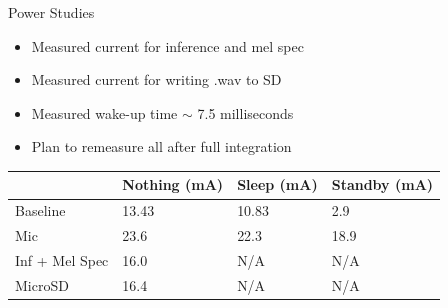 \begin{frame}{Power Studies}
    \begin{itemize}
        \item Measured current for inference and mel spec 
        \item Measured current for writing .wav to SD
        \item Measured wake-up time $\sim$ 7.5 milliseconds
        \item Plan to remeasure all after full integration
    \end{itemize}
    \begin{center}
        \begin{table}[]
        \begin{tabular}{llll}
        \hline
                & Nothing (mA) & Sleep (mA) & Standby (mA) \\ \hline
        Baseline       & 13.43        & 10.83      & 2.9          \\
        Mic            & 23.6         & 22.3       & 18.9         \\
        Inf + Mel Spec & 16.0         & N/A        & N/A          \\
        MicroSD        & 16.4         & N/A        & N/A          \\ \hline
        \end{tabular}
        \end{table}
    \end{center}

\end{frame}

